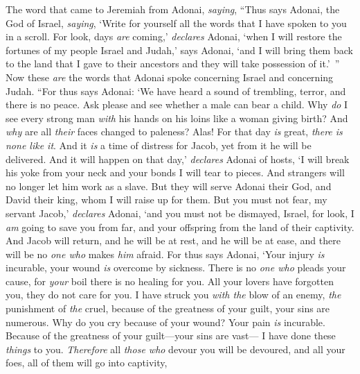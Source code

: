 \begin{biblechapter} %
 The word that came to Jeremiah from Adonai, \textit{saying},
\verse “Thus says Adonai, the God of Israel, \textit{saying}, ‘Write for yourself all the words that I have spoken to you in a scroll.
\verse For look, days \textit{are} coming,’ \textit{declares} Adonai, ‘when I will restore the fortunes of my people Israel and Judah,’ says Adonai, ‘and I will bring them back to the land that I gave to their ancestors and they will take possession of it.’ ”
\verse Now these \textit{are} the words that Adonai spoke concerning Israel and concerning Judah.
\verse “For thus says Adonai:
\verse ‘We have heard a sound of trembling, 
terror, and there is no peace.
\verse Ask please and see whether a male can bear a child. 
Why \textit{do} I see every strong man 
\textit{with} his hands on his loins like a woman giving birth? 
And \textit{why} are all \textit{their} faces changed to paleness?
\verse Alas! For that day \textit{is} great, 
\textit{there is none like it}. 
And it \textit{is} a time of distress for Jacob, 
yet from it he will be delivered.
\verse And it will happen on that day,’ \textit{declares} Adonai of hosts, 
‘I will break his yoke from your neck 
and your bonds I will tear to pieces. 
And strangers will no longer let him work as a slave.
\verse But they will serve Adonai their God, 
and David their king, whom I will raise up for them.
\verse But you must not fear, my servant Jacob,’ \textit{declares} Adonai, 
‘and you must not be dismayed, Israel, 
for look, I \textit{am} going to save you from far, 
and your offspring from the land of their captivity. 
And Jacob will return, 
and he will be at rest, 
and he will be at ease, 
and there will be no \textit{one who} makes \textit{him} afraid.
\verse For thus says Adonai,
\verse ‘Your injury \textit{is} incurable, 
your wound \textit{is} overcome by sickness.
\verse There is no \textit{one who} pleads your cause, 
for \textit{your} boil there is no healing for you.
\verse All your lovers have forgotten you, 
they do not care for you. 
I have struck you \textit{with the} blow of an enemy, 
\textit{the} punishment of \textit{the} cruel, 
because of the greatness of your guilt, 
your sins are numerous.
\verse Why do you cry because of your wound? 
Your pain \textit{is} incurable. 
Because of the greatness of your guilt—your sins are vast— 
I have done these \textit{things} to you.
\verse \textit{Therefore} all \textit{those who} devour you will be devoured, 
and all your foes, all of them will go into captivity, 

\end{biblechapter}

